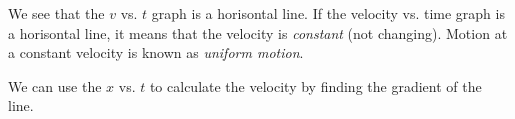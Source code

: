         \label{m38795*id70236}We see that the \begin{math}v\end{math} vs. \begin{math}t\end{math} graph is a horisontal line. If the velocity vs. time graph is a horisontal line, it means that the velocity is \textsl{constant} (not changing). Motion at a constant velocity is known as \textsl{uniform motion}.\par 
        \label{m38795*id70269}We can use the \begin{math}x\end{math} vs. \begin{math}t\end{math} to calculate the velocity by finding the gradient of the line.\par 
        \label{m38795*id70291}\nopagebreak\noindent{}
